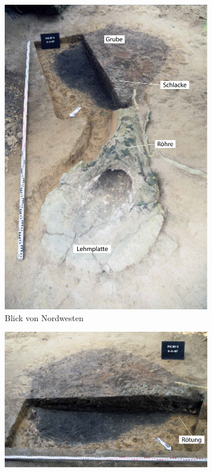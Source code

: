 \begin{figure}[p]
\centering
\begin{subfigure}[b]{.475\textwidth}
\includegraphics[width = \textwidth]{fig/PIK87-3_E87-016-20.pdf}
\caption{Blick von Nordwesten}
\label{fig:PIK87-3_vonNW}
\end{subfigure}\hfill
\begin{subfigure}[b]{.5015\textwidth}
\includegraphics[width = \textwidth]{fig/PIK87-3_E87-016-24.pdf}

\end{subfigure}
\end{figure}
